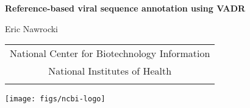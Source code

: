 \documentclass[landscape]{slides}
\begin{document}
\begin{slide}
\begin{center}
\large{\textbf{Reference-based viral sequence annotation using VADR}}

\normalsize

Eric Nawrocki \\

\medskip

\medskip

\medskip

\medskip

\medskip

\small
\begin{tabular}{c}
National Center for Biotechnology Information\\
National Institutes of Health\\
\\
\end{tabular}

\vspace{0.1in}

\texttt{[image: figs/ncbi-logo]}

\end{center}
\end{slide}
\end{document}
